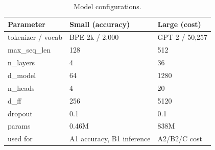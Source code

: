 \begin{table}[t]\centering\caption{Model configurations.}
\begin{tabular}{lll}\hline
Parameter & Small (accuracy) & Large (cost) \\\hline
tokenizer / vocab & BPE-2k / 2,000 & GPT-2 / 50,257 \\
max_seq_len & 128 & 512 \\
n_layers & 4 & 36 \\
d_model & 64 & 1280 \\
n_heads & 4 & 20 \\
d_ff & 256 & 5120 \\
dropout & 0.1 & 0.1 \\
params & 0.46M & 838M \\
used for & A1 accuracy, B1 inference & A2/B2/C cost \\
\hline\end{tabular}\end{table}
